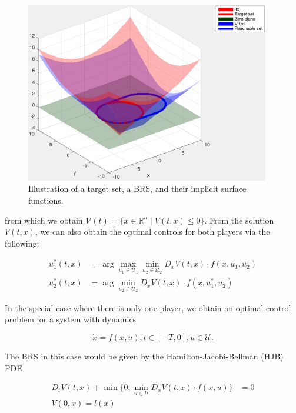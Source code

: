 \begin{figure}
	\centering
	\includegraphics[width=0.95\textwidth]{"fig/RSExample"}
	\caption{Illustration of a target set, a BRS, and their implicit surface functions.}
	\label{fig:RSExample}
\end{figure}

\noindent from which we obtain $\mathcal{V}(t) = \{x\in\mathbb{R}^n \mid V(t,x)\le 0\}$. From the solution $V(t,x)$, we can also obtain the optimal controls for both players via the following:

\begin{equation} \label{eq:HJI_ctrl_syn}
\begin{aligned}
u_1^*(t,x) &= \arg \max_{u_1\in\mathcal{U}_1} \min_{u_2\in\mathcal U_2} D_x V(t,x) \cdot f(x,u_1,u_2)\\
u_2^*(t,x) &= \arg \min_{u_2\in\mathcal{U}_2} D_x V(t,x) \cdot f(x,u_1^*,u_2)
\end{aligned}
\end{equation}

In the special case where there is only one player, we obtain an optimal control problem for a system with dynamics

\begin{equation} \label{eq:dyn_d}
\dot{x} = f(x, u), t\in [-T,0], u\in\mathcal U.
\end{equation}

The BRS in this case would be given by the Hamilton-Jacobi-Bellman (HJB) PDE

\begin{equation} \label{eq:HJBPDE}
\begin{aligned}
D_t V(t,x) + \min \{0, \min_{u\in\mathcal{U}} D_x V(t,x) \cdot f(x,u)\} &= 0 \\
V(0,x) = l(x)&
\end{aligned}
\end{equation}

